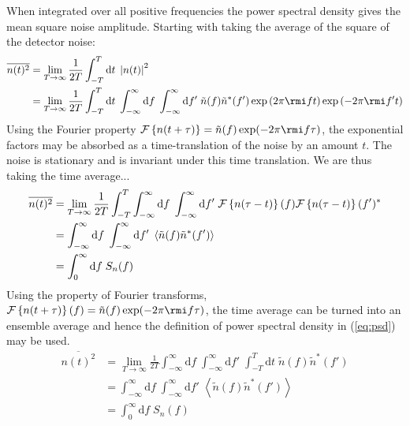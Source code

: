 When integrated over all positive frequencies the power spectral density gives the mean square noise amplitude. Starting with taking the average of the square of the detector noise:
\begin{eqnarray}\label{eq:meansquare}
\overline{n(t)^{2}} &= \lim_{T\rightarrow\infty}\frac{1}{2T}\int_{-T}^{T}\mathrm{d}t\;\left| n(t) \right|^{2} \nonumber \\
 &= \lim_{T\rightarrow\infty}\frac{1}{2T}\int_{-T}^{T}\mathrm{d}t\; \int_{-\infty}^{\infty}\mathrm{d}f\;\int_{-\infty}^{\infty}\mathrm{d}f'\;\tilde{n}(f)\tilde{n}^{*}(f')\exp\left(2\pi \rmi ft \right)\exp\left(-2\pi \rmi f't \right)
\end{eqnarray}
Using the Fourier property ${\mathcal{F}}\left\{ n(t+\tau) \right\} = \tilde{n}(f)\exp (-2\pi \rmi f\tau )$, the exponential factors may be absorbed as a time-translation of the noise by an amount $t$. The noise is stationary and is invariant under this time translation. We are thus taking the time average...
\begin{eqnarray}\label{eq:meansquare1}
\overline{n(t)^{2}} & = \lim_{T\rightarrow\infty}\frac{1}{2T}\int_{-T}^{T}\int_{-\infty}^{\infty}\mathrm{d}f\;\int_{-\infty}^{\infty}\mathrm{d}f'\;{\cal{F}}\left\{ n(\tau-t) \right\}(f){\cal{F}}\left\{ n(\tau-t) \right\}(f')^{*} \nonumber \\
&=\int_{-\infty}^{\infty}\mathrm{d}f\;\int_{-\infty}^{\infty}\mathrm{d}f'\;\left<\tilde{n}(f)\tilde{n}^{*}(f')\right>\nonumber \\
& = \int_{0}^{\infty}\mathrm{d}f\; S_{n}(f)
\end{eqnarray}
Using the property of Fourier transforms, ${\cal{F}}\left\{ n(t+\tau) \right\}(f)=\tilde{n}(f)\exp (-2\pi \rmi f\tau )$, the time average can be turned into an ensemble average and hence the definition of power spectral density in (\ref{eq:psd}) may be used.
\begin{eqnarray}\label{eq:meansquare1}
\overline{n(t)^{2}}& = \lim_{T\rightarrow\infty}\frac{1}{2T}\int_{-\infty}^{\infty}\mathrm{d}f\;\int_{-\infty}^{\infty}\mathrm{d}f'\;\int_{-T}^{T}\mathrm{d}t\; \tilde{n}(f)\tilde{n}^{*}(f') \nonumber \\
&=\int_{-\infty}^{\infty}\mathrm{d}f\;\int_{-\infty}^{\infty}\mathrm{d}f'\;\left<\tilde{n}(f)\tilde{n}^{*}(f')\right>\nonumber \\
& = \int_{0}^{\infty}\mathrm{d}f\; S_{n}(f)
\end{eqnarray}

